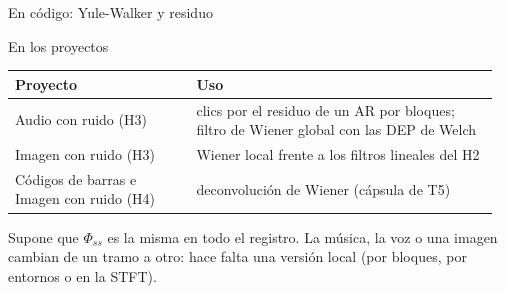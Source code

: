 \documentclass[aspectratio=169,11pt]{beamer}
\begin{document}
\begin{frame}{En código: Yule-Walker y residuo}
\end{frame}

\begin{frame}{En los proyectos}
  \footnotesize
  \begin{tabular}{@{}p{0.36\linewidth}p{0.6\linewidth}@{}}
    \toprule
    Proyecto & Uso \\ \midrule
    Audio con ruido (H3) & clics por el residuo de un AR por bloques; filtro de Wiener global con las DEP de Welch \\
    Imagen con ruido (H3) & Wiener local frente a los filtros lineales del H2 \\
    Códigos de barras e Imagen con ruido (H4) & deconvolución de Wiener (cápsula de T5) \\
    \bottomrule
  \end{tabular}
  \bigskip
  \begin{importante}
    Supone que $\Phi_{ss}$ es la misma en todo el registro. La música, la voz o una imagen cambian de un tramo a otro: hace falta una versión local (por bloques, por entornos o en la STFT).
  \end{importante}
\end{frame}
\end{document}
